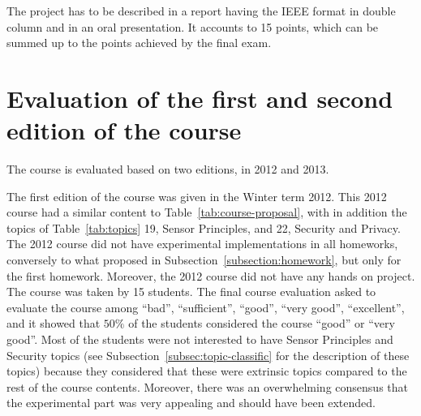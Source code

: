 \documentclass[onecolumn,12pt,draftclsnofoot,a4paper,peerreview]{IEEEtran}
\begin{document}
The project has to be described in a report having the IEEE format in double column and in an oral presentation. It accounts to 15 points, which can be summed up to the points achieved by the final exam. 

\section{Evaluation of the first and second edition of the course} 

The course is evaluated based on two editions, in 2012 and 2013. 

The first edition of the course was given in the Winter term 2012. This 2012 course had a similar content to Table~\ref{tab:course-proposal}, with in addition the topics of Table~\ref{tab:topics} 19, Sensor Principles, and 22, Security and Privacy. The 2012 course did not have experimental implementations in all homeworks, conversely to what proposed in Subsection~\ref{subsection:homework}, but only for the first homework. Moreover, the 2012 course did not have any hands on project. The course was taken by 15 students. The final course evaluation asked to evaluate the course among ``bad'', ``sufficient'', ``good'', ``very good'', ``excellent'', and it showed that $50\%$ of the students considered the course ``good'' or ``very good''. Most of the students were not interested to have Sensor Principles and Security topics (see Subsection~\ref{subsec:topic-classific} for the description of these topics) because they considered that these were extrinsic topics compared to the rest of the course contents. Moreover, there was an overwhelming consensus that the experimental part was very appealing and should have been extended. 
\end{document}
